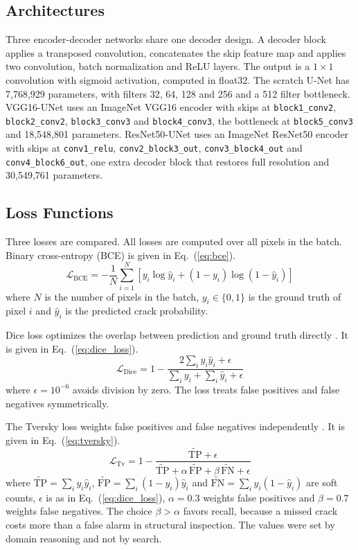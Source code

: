 \documentclass[conference]{IEEEtran}
\begin{document}
\subsection{Architectures}
Three encoder-decoder networks share one decoder design. A decoder block applies a transposed convolution, concatenates the skip feature map and applies two convolution, batch normalization and ReLU layers. The output is a $1\times1$ convolution with sigmoid activation, computed in float32. The scratch U-Net has 7,768,929 parameters, with filters 32, 64, 128 and 256 and a 512 filter bottleneck. VGG16-UNet uses an ImageNet VGG16 encoder with skips at \texttt{block1\_conv2}, \texttt{block2\_conv2}, \texttt{block3\_conv3} and \texttt{block4\_conv3}, the bottleneck at \texttt{block5\_conv3} and 18,548,801 parameters. ResNet50-UNet uses an ImageNet ResNet50 encoder with skips at \texttt{conv1\_relu}, \texttt{conv2\_block3\_out}, \texttt{conv3\_block4\_out} and \texttt{conv4\_block6\_out}, one extra decoder block that restores full resolution and 30,549,761 parameters.

\subsection{Loss Functions}
Three losses are compared. All losses are computed over all pixels in the batch. Binary cross-entropy (BCE) is given in Eq.~(\ref{eq:bce}).
\begin{equation}
\mathcal{L}_{\mathrm{BCE}}=-\frac{1}{N}\sum_{i=1}^{N}\left[y_i\log\hat{y}_i+(1-y_i)\log(1-\hat{y}_i)\right]
\label{eq:bce}
\end{equation}
\noindent where $N$ is the number of pixels in the batch, $y_i\in\{0,1\}$ is the ground truth of pixel $i$ and $\hat{y}_i$ is the predicted crack probability.

Dice loss optimizes the overlap between prediction and ground truth directly \cite{vnet}. It is given in Eq.~(\ref{eq:dice_loss}).
\begin{equation}
\mathcal{L}_{\mathrm{Dice}}=1-\frac{2\sum_i y_i\hat{y}_i+\epsilon}{\sum_i y_i+\sum_i\hat{y}_i+\epsilon}
\label{eq:dice_loss}
\end{equation}
\noindent where $\epsilon=10^{-6}$ avoids division by zero. The loss treats false positives and false negatives symmetrically.

The Tversky loss weights false positives and false negatives independently \cite{tversky}. It is given in Eq.~(\ref{eq:tversky}).
\begin{equation}
\mathcal{L}_{\mathrm{Tv}}=1-\frac{\widetilde{\mathrm{TP}}+\epsilon}{\widetilde{\mathrm{TP}}+\alpha\,\widetilde{\mathrm{FP}}+\beta\,\widetilde{\mathrm{FN}}+\epsilon}
\label{eq:tversky}
\end{equation}
\noindent where $\widetilde{\mathrm{TP}}=\sum_i y_i\hat{y}_i$, $\widetilde{\mathrm{FP}}=\sum_i(1-y_i)\hat{y}_i$ and $\widetilde{\mathrm{FN}}=\sum_i y_i(1-\hat{y}_i)$ are soft counts, $\epsilon$ is as in Eq.~(\ref{eq:dice_loss}), $\alpha=0.3$ weights false positives and $\beta=0.7$ weights false negatives. The choice $\beta>\alpha$ favors recall, because a missed crack costs more than a false alarm in structural inspection. The values were set by domain reasoning and not by search.
\end{document}
